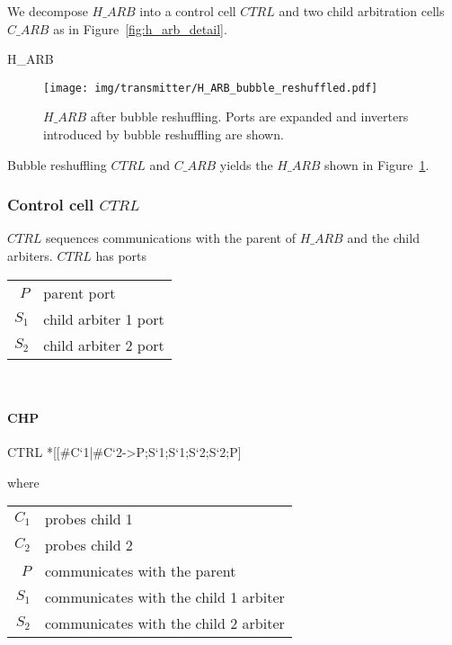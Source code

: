 \documentclass[aer.tex]{subfiles}
\begin{document}
We decompose $H\!\_ARB$ into a control cell $CTRL$ and two child arbitration cells $C\_ARB$ as in Figure~\ref{fig:h_arb_detail}.

\begin{csp}
H\_ARB
\end{csp}

\begin{figure}
  \centering
  \texttt{[image: img/transmitter/H\_ARB\_bubble\_reshuffled.pdf]}
  \caption{$H\!\_ARB$ after bubble reshuffling. Ports are expanded and inverters introduced by bubble reshuffling are shown.}
  \label{fig:h_arb_bubbled}
\end{figure}

\noindent Bubble reshuffling $CTRL$ and $C\_ARB$ yields the $H\!\_ARB$ shown in Figure~\ref{fig:h_arb_bubbled}.

\subsubsection{Control cell $CTRL$}
$CTRL$ sequences communications with the parent of $H\!\_ARB$ and the child arbiters.
$CTRL$ has ports

\begin{tabular}[]{rl}
$P$ & parent port \\
$S_1$ & child arbiter 1 port \\
$S_2$ & child arbiter 2 port \\
\end{tabular} \\

\paragraph{CHP} 

\begin{csp}
CTRL\equiv
  *[[#{C`1}|#{C`2}->P;S`1;S`1;S`2;S`2;P]
\end{csp}

\noindent where 

\begin{tabular}[]{rl}
  $C_1$ & probes child 1 \\
  $C_2$ & probes child 2 \\
  $P$ & communicates with the parent \\
  $S_1$ & communicates with the child 1 arbiter \\
  $S_2$ & communicates with the child 2 arbiter \\
\end{tabular} \\ \\
\end{document}
